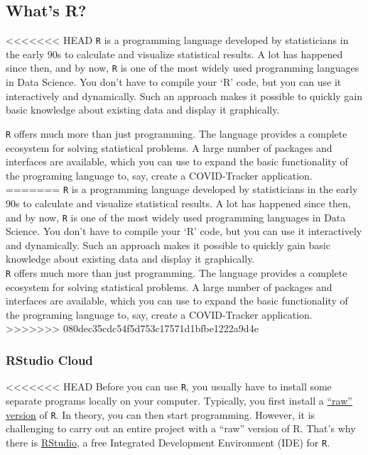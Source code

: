 \documentclass[
  11pt,
]{article}
\begin{document}
\hypertarget{whats-r}{%
\subsection{What's R?}\label{whats-r}}

<<<<<<< HEAD
\texttt{R} is a programming language developed by statisticians in the early 90s to calculate and visualize statistical results.
A lot has happened since then, and by now, \texttt{R} is one of the most widely used programming languages in Data Science.
You don't have to compile your `R' code, but you can use it interactively and dynamically.
Such an approach makes it possible to quickly gain basic knowledge about existing data and display it graphically.

\texttt{R} offers much more than just programming.
The language provides a complete ecosystem for solving statistical problems.
A large number of packages and interfaces are available, which you can use to expand the basic functionality of the programing language to, say, create a COVID-Tracker application.
=======
\texttt{R} is a programming language developed by statisticians in the early 90s to calculate and visualize statistical results. A lot has happened since then, and by now, \texttt{R} is one of the most widely used programming languages in Data Science. You don't have to compile your `R' code, but you can use it interactively and dynamically. Such an approach makes it possible to quickly gain basic knowledge about existing data and display it graphically.\\
\texttt{R} offers much more than just programming. The language provides a complete ecosystem for solving statistical problems. A large number of packages and interfaces are available, which you can use to expand the basic functionality of the programing language to, say, create a COVID-Tracker application.
>>>>>>> 080dec35cdc54f5d753c17571d1bfbe1222a9d4e

\hypertarget{rstudio-cloud}{%
\subsubsection{RStudio Cloud}\label{rstudio-cloud}}

<<<<<<< HEAD
Before you can use \texttt{R}, you usually have to install some separate programs locally on your computer.
Typically, you first install a \href{https://rstudio-education.github.io/hopr/starting.html}{``raw'' version} of \texttt{R}.
In theory, you can then start programming.
However, it is challenging to carry out an entire project with a ``raw'' version of R.
That's why there is \href{https://www.rstudio.com/products/rstudio/download/}{RStudio}, a free Integrated Development Environment (IDE) for \texttt{R}.
\end{document}
